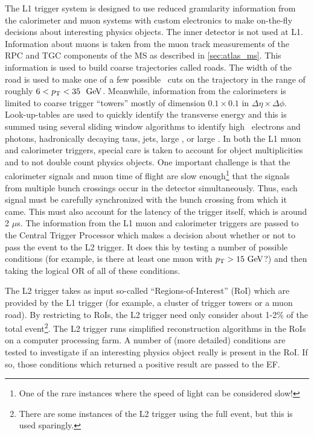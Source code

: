 The L1 trigger system is designed to use reduced granularity information
from the calorimeter and muon systems with custom electronics
to make on-the-fly decisions about interesting physics objects.
The inner detector is not used at L1.
Information about muons is taken from the muon track measurements of 
the RPC and TGC components of the MS
as described in \sec\ref{sec:atlas_ms}. This information is 
used to build coarse trajectories called roads. The width of the road
is used to make one of a few possible \pt~cuts on the 
trajectory in the range of roughly $6<\pt<35~\GeV$. 
Meanwhile, information from the 
calorimeters is limited to coarse trigger ``towers'' mostly of dimension
$0.1 \times 0.1$ in $\Delta\eta \times \Delta\phi$.
Look-up-tables are used to quickly identify the transverse energy 
and this is summed using several sliding window algorithms to identify 
high \pt~electrons and photons, hadronically decaying taus, jets, large \met,
or large \et. 
In both the L1 muon and calorimeter triggers, special care is taken
to account for object multiplicities and to not double count physics objects. 
One important challenge is that the 
calorimeter signals and muon time of flight are slow enough\footnote{One
of the rare instances where the speed of light can be considered slow!}
that the signals from multiple bunch crossings occur in the detector
simultaneously.  Thus, each signal must be carefully synchronized with 
the bunch crossing from which it came.  
This must also account for the latency of the trigger itself, which
is around 2 $\mu$s.  The information
from the L1 muon and calorimeter triggers are passed to the Central
Trigger Processor which makes a decision about whether or not to pass
the event to the L2 trigger.  It does this by testing 
a number of possible conditions (for example, is there at least one
muon with $\pt > 15 \GeV$?) and then taking the logical OR of all of
these conditions.

The L2 trigger takes as input so-called ``Regions-of-Interest'' (RoI)
which are provided by the L1 trigger (for example, a cluster of 
trigger towers or a muon road). By restricting to RoIs,
the L2 trigger need only consider about 1-2\% of the 
total event\footnote{There are some instances of the L2 trigger
using the full event, but this is used sparingly.}. 
The L2 trigger runs simplified reconstruction algorithms in the RoIs 
on a computer processing farm. 
A number of  (more detailed) conditions are tested
to investigate 
if an interesting physics object really is present in the RoI.
If so, those conditions which returned a positive result are 
passed to the EF.

